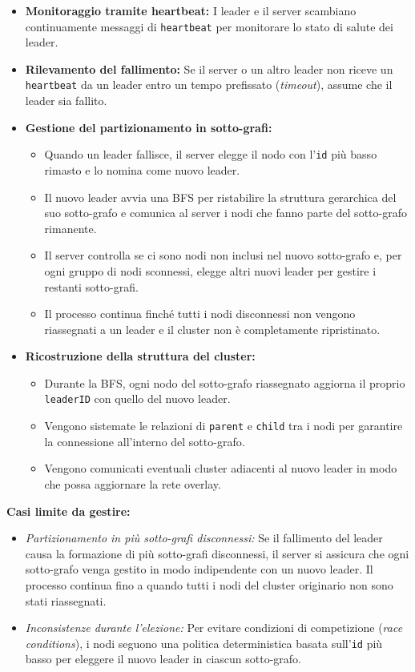 \documentclass[12pt, a4paper]{report}
\begin{document}
\begin{itemize}
    \item \textbf{Monitoraggio tramite heartbeat:} I leader e il server scambiano continuamente messaggi di \texttt{heartbeat} per monitorare lo stato di salute dei leader.
    \item \textbf{Rilevamento del fallimento:} Se il server o un altro leader non riceve un \texttt{heartbeat} da un leader entro un tempo prefissato (\textit{timeout}), assume che il leader sia fallito.
    \item \textbf{Gestione del partizionamento in sotto-grafi:}
    \begin{itemize}
        \item Quando un leader fallisce, il server elegge il nodo con l'\texttt{id} pi\`u basso rimasto e lo nomina come nuovo leader. 
        \item Il nuovo leader avvia una BFS per ristabilire la struttura gerarchica del suo sotto-grafo e comunica al server i nodi che fanno parte del sotto-grafo rimanente.
        \item Il server controlla se ci sono nodi non inclusi nel nuovo sotto-grafo e, per ogni gruppo di nodi sconnessi, elegge altri nuovi leader per gestire i restanti sotto-grafi.
        \item Il processo continua finché tutti i nodi disconnessi non vengono riassegnati a un leader e il cluster non \`e completamente ripristinato.
    \end{itemize}
    \item \textbf{Ricostruzione della struttura del cluster:}
    \begin{itemize}
        \item Durante la BFS, ogni nodo del sotto-grafo riassegnato aggiorna il proprio \texttt{leaderID} con quello del nuovo leader.
        \item Vengono sistemate le relazioni di \texttt{parent} e \texttt{child} tra i nodi per garantire la connessione all'interno del sotto-grafo.
        \item Vengono comunicati eventuali cluster adiacenti al nuovo leader in modo che possa aggiornare la rete overlay.
    \end{itemize}
\end{itemize}

\textbf{Casi limite da gestire:}

\begin{itemize}
    \item \textit{Partizionamento in pi\`u sotto-grafi disconnessi:} Se il fallimento del leader causa la formazione di pi\`u sotto-grafi disconnessi, il server si assicura che ogni sotto-grafo venga gestito in modo indipendente con un nuovo leader. Il processo continua fino a quando tutti i nodi del cluster originario non sono stati riassegnati.
    \item \textit{Inconsistenze durante l'elezione:} Per evitare condizioni di competizione (\textit{race conditions}), i nodi seguono una politica deterministica basata sull'\texttt{id} pi\`u basso per eleggere il nuovo leader in ciascun sotto-grafo.
\end{itemize}
\end{document}

